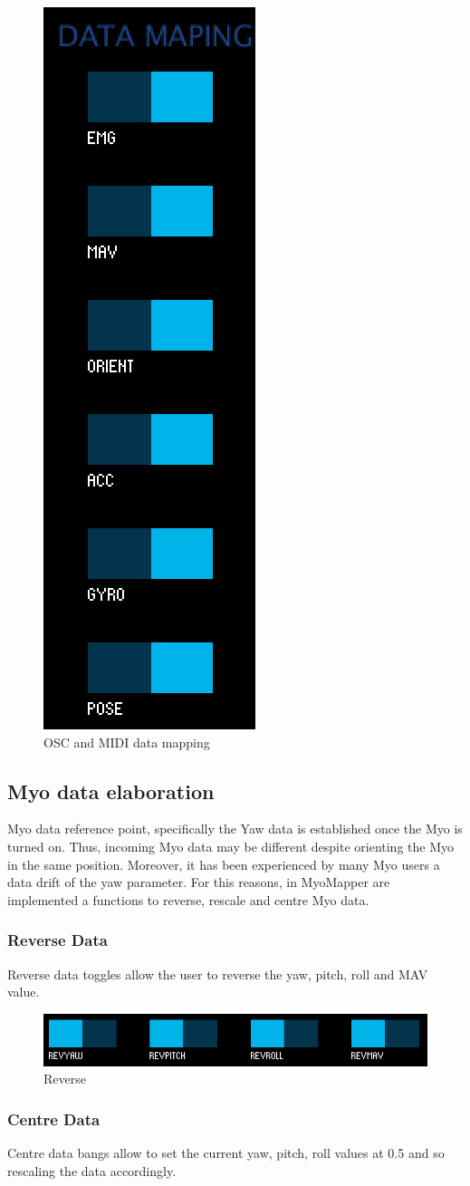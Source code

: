 \documentclass[12pt,a4paper]{article}
\begin{document}
		\begin{figure}[h]
			\centering
			\includegraphics[height=0.6\linewidth]{../MyoMapper-DataMapping}
			\caption{OSC and MIDI data mapping}
			\label{fig:MyoMapper-DataMapping}
		\end{figure}
		
		\subsection{Myo data elaboration}
		Myo data reference point, specifically the Yaw data is established once the Myo is turned on. Thus, incoming Myo data may be different despite orienting the Myo in the same position. Moreover, it has been experienced by many Myo users a data drift of the yaw parameter.
		For this reasons, in MyoMapper are implemented a functions to reverse, rescale and centre Myo data.
		
		\subsubsection*{Reverse Data} 
		Reverse data toggles allow the user to reverse the yaw, pitch, roll and MAV value.
		
		\begin{figure}[h]
			\centering
			\includegraphics[width=0.6\linewidth]{../MyoMapper-Rev}
			\caption{Reverse}
			\label{fig:MyoMapper-Rev}
		\end{figure}		

		\subsubsection*{Centre Data}
		Centre data bangs allow to set the current yaw, pitch, roll values at 0.5 and so rescaling the data accordingly.
		
\end{document}
